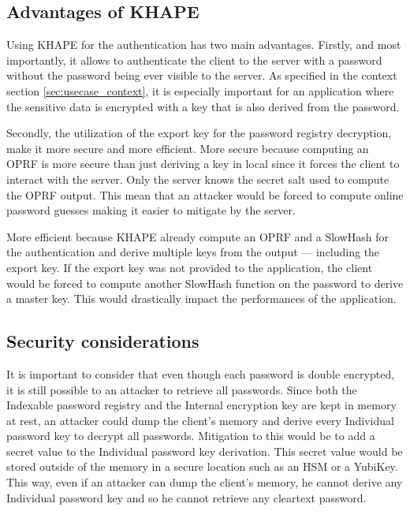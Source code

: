 \documentclass[../report.tex]{subfiles}
\begin{document}
\subsection{Advantages of KHAPE}
Using KHAPE for the authentication has two main advantages.
Firstly, and most importantly, it allows to authenticate the client to the server with a password without the password being ever visible to the server. As specified in the context section \ref{sec:usecase_context}, it is especially important for an application where the sensitive data is encrypted with a key that is also derived from the password.

Secondly, the utilization of the export key for the password registry decryption, make it more secure and more efficient.
More secure because computing an OPRF is more secure than just deriving a key in local since it forces the client to interact with the server. Only the server knows the secret salt used to compute the OPRF output. 
This mean that an attacker would be forced to compute online password guesses making it easier to mitigate by the server.

More efficient because KHAPE already compute an OPRF and a SlowHash for the authentication and derive multiple keys from the output --- including the export key.
If the export key was not provided to the application, the client would be forced to compute another SlowHash function on the password to derive a master key. This would drastically impact the performances of the application.


\subsection{Security considerations}
It is important to consider that even though each password is double encrypted, it is still possible to an attacker to retrieve all passwords. Since both the Indexable password registry and the Internal encryption key are kept in memory at rest, an attacker could dump the client's memory and derive every Individual password key to decrypt all passwords.
Mitigation to this would be to add a secret value to the Individual password key derivation. This secret value would be stored outside of the memory in a secure location such as an HSM or a YubiKey. This way, even if an attacker can dump the client's memory, he cannot derive any Individual password key and so he cannot retrieve any cleartext password. 

% 
% 
% 
\end{document}
